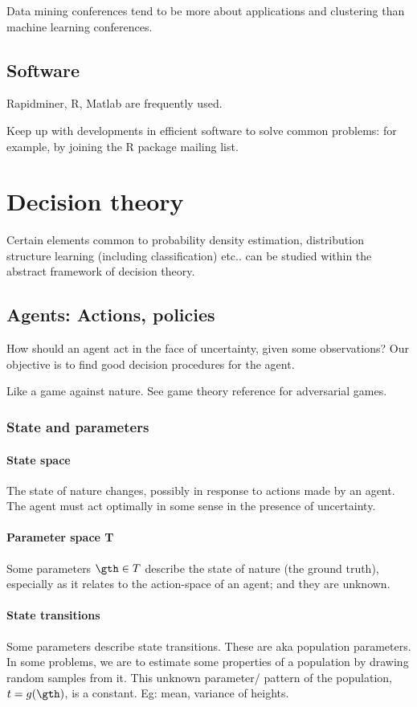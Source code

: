 \documentclass[oneside, article]{memoir}
\begin{document}
Data mining conferences tend to be more about applications and clustering than machine learning conferences.


\section{Software}
Rapidminer, R, Matlab are frequently used.

Keep up with developments in efficient software to solve common problems: for example, by joining the R package mailing list.

\chapter{Decision theory}
Certain elements common to probability density estimation, distribution structure learning (including classification) etc.. can be studied within the abstract framework of decision theory.

\section{Agents: Actions, policies}
How should an agent act in the face of uncertainty, given some observations? Our objective is to find good decision procedures for the agent.

Like a game against nature. See game theory reference for adversarial games.

\subsection{State and parameters}
\subsubsection{State space}
The state of nature changes, possibly in response to actions made by an agent. The agent must act optimally in some sense in the presence of uncertainty.

\subsubsection{Parameter space T}
Some parameters $\gth \in T$ describe the state of nature (the ground truth), especially as it relates to the action-space of an agent; and they are unknown.

\subsubsection{State transitions}
Some parameters describe state transitions. These are aka population parameters. In some problems, we are to estimate some properties of a population by drawing random samples from it. This unknown parameter/ pattern of the population, $t = g(\gth)$, is a constant. Eg: mean, variance of heights.
\end{document}
